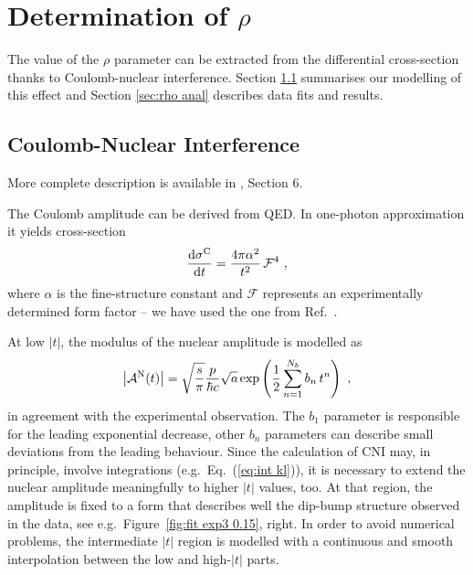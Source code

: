 \section{Determination of $\rho$}
\label{sec:rho}

The value of the $\rho$ parameter can be extracted from the differential cross-section thanks to Coulomb-nuclear interference. Section \ref{sec:rho cni} summarises our modelling of this effect and Section \ref{sec:rho anal} describes data fits and results.

\subsection{Coulomb-Nuclear Interference}
\label{sec:rho cni}

 More complete description is available in \cite{totem-8tev-1km}, Section 6.

The Coulomb amplitude can be derived from QED. In one-photon approximation it yields cross-section
\begin{equation}
\label{eq:coul cs}
	{{\rm d}\sigma^{\rm C}\over {\rm d}t} = {4\pi\alpha^2\over t^2}\,{\mathcal{F}}^4\ ,
\end{equation}
where $\alpha$ is the fine-structure constant and $\mathcal{F}$ represents an experimentally determined form factor -- we have used the one from Ref.~\cite{puckett10}.

At low $|t|$, the modulus of the nuclear amplitude is modelled as
\begin{equation}
\label{eq:nuc mod}
\left | {\cal A}^{\rm N}(t) \right | = \sqrt{s\over\pi} {p\over \hbar c} \sqrt{a} \exp\left( {1\over 2} \sum\limits_{n = 1}^{N_b} b_n\, t^n \right)\ ,
\end{equation}
in agreement with the experimental observation. The $b_1$ parameter is responsible for the leading exponential decrease, other $b_n$ parameters can describe small deviations from the leading behaviour. Since the calculation of CNI may, in principle, involve integrations (e.g.~Eq.~(\ref{eq:int kl})), it is necessary to extend the nuclear amplitude meaningfully to higher $|t|$ values, too. At that region, the amplitude is fixed to a form that describes well the dip-bump structure observed in the data, see e.g.~Figure~\ref{fig:fit exp3 0.15}, right. In order to avoid numerical problems, the intermediate $|t|$ region is modelled with a continuous and smooth interpolation between the low and high-$|t|$ parts. 

